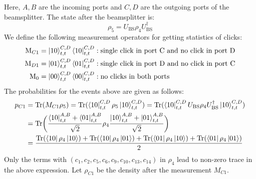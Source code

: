 Here, $A, B$ are the incoming ports and $C,D$ are the outgoing ports of the beamsplitter. The state after the beamsplitter is:
\begin{equation}
    \rho_{5} = U_{\text{BS}}\rho_{4}U_{\text{BS}}^{\dagger}
\end{equation}
We define the following measurement operators for getting statistics of clicks:
\begin{subequations}
    \begin{align}
        \text{M}_{C1} &= \ket{10}^{C,D}_{t,t} \bra{10}^{C,D}_{t,t}: \text{single click in port C and no click in port D}\\
        \text{M}_{D1} &= \ket{01}^{C,D}_{t,t} \bra{01}^{C,D}_{t,t}: \text{single click in port D and no click in port C}\\
        \text{M}_{0} &= \ket{00}^{C,D}_{t,t} \bra{00 }^{C,D}_{t,t}: \text{no clicks in both ports}
    \end{align}
\end{subequations}
The probabilities for the events above are given as follows:
\begin{subequations}
    \begin{align}
        p_{C1} &= \text{Tr}(M_{C1}\rho_{5}) = \text{Tr}(\bra{10}^{C,D}_{t,t}\rho_{5}\ket{10}^{C,D}_{t,t}) = \text{Tr}(\bra{10}^{C,D}_{t,t}U_{\text{BS}}\rho_{4}U_{\text{BS}}^{\dagger}\ket{10}^{C,D}_{t,t})\\
        &= \text{Tr}\bigg(\frac{\bra{10}^{A,B}_{t,t}+\bra{01}^{A,B}_{t,t}}{\sqrt{2}} \rho_{4}        \frac{\ket{10}^{A,B}_{t,t}+\ket{01}^{A,B}_{t,t}}{\sqrt{2}} \bigg)\\
        &= \frac{ \text{Tr}(\bra{10}\rho_{4}\ket{10}) + \text{Tr}(\bra{10}\rho_{4}\ket{01}) + \text{Tr}(\bra{01}\rho_{4}\ket{10}) + \text{Tr}(\bra{01}\rho_{4}\ket{01}) }{2}
    \end{align}
\end{subequations}
Only the terms with $(c_{1}, c_{2}, c_{5}, c_{6}, c_{9}, c_{10}, c_{13}, c_{14})$ in $\rho_{4}$ lead to non-zero trace in the above expression. Let $\rho_{C1}$ be the density after the measurement $M_{C1}$. 

